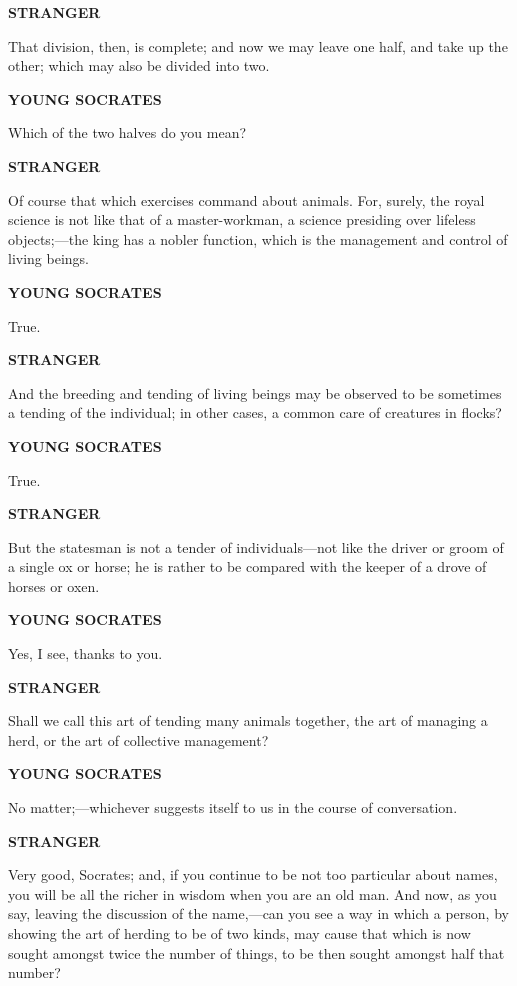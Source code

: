 \documentclass[11pt,letter]{article}
\begin{document}
\par \textbf{STRANGER}
\par   That division, then, is complete; and now we may leave one half, and take up the other; which may also be divided into two.

\par \textbf{YOUNG SOCRATES}
\par   Which of the two halves do you mean?

\par \textbf{STRANGER}
\par   Of course that which exercises command about animals. For, surely, the royal science is not like that of a master-workman, a science presiding over lifeless objects;—the king has a nobler function, which is the management and control of living beings.

\par \textbf{YOUNG SOCRATES}
\par   True.

\par \textbf{STRANGER}
\par   And the breeding and tending of living beings may be observed to be sometimes a tending of the individual; in other cases, a common care of creatures in flocks?

\par \textbf{YOUNG SOCRATES}
\par   True.

\par \textbf{STRANGER}
\par   But the statesman is not a tender of individuals—not like the driver or groom of a single ox or horse; he is rather to be compared with the keeper of a drove of horses or oxen.

\par \textbf{YOUNG SOCRATES}
\par   Yes, I see, thanks to you.

\par \textbf{STRANGER}
\par   Shall we call this art of tending many animals together, the art of managing a herd, or the art of collective management?

\par \textbf{YOUNG SOCRATES}
\par   No matter;—whichever suggests itself to us in the course of conversation.

\par \textbf{STRANGER}
\par   Very good, Socrates; and, if you continue to be not too particular about names, you will be all the richer in wisdom when you are an old man. And now, as you say, leaving the discussion of the name,—can you see a way in which a person, by showing the art of herding to be of two kinds, may cause that which is now sought amongst twice the number of things, to be then sought amongst half that number?
\end{document}
